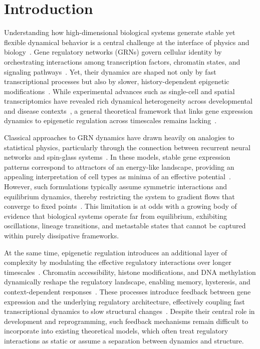 \documentclass[reprint,amsmath,amssymb,aps]{revtex4-2}
\begin{document}
\section{Introduction}
\label{intro}
Understanding how high-dimensional biological systems generate stable yet flexible dynamical behavior is a central challenge at the interface of physics and biology~\cite{Waddington,tripathi2023minimal,Raju1,Raju3}. Gene regulatory networks (GRNs) govern cellular identity by orchestrating interactions among transcription factors, chromatin states, and signaling pathways~\cite{slack1991,Waddington,kaneko2007evolution,KanekoScience2012}. Yet, their dynamics are shaped not only by fast transcriptional processes but also by slower, history-dependent epigenetic modifications~\cite{kaneko2007evolution,KanekoPRR2020}. While experimental advances such as single-cell and spatial transcriptomics have revealed rich dynamical heterogeneity across developmental and disease contexts~\cite{Klein1,garg2023single,Mohit,Mohit2,wang2024transiently,Briscoe1,Briscoe2}, a general theoretical framework that links gene expression dynamics to epigenetic regulation across timescales remains lacking~\cite{KanekoPRR2020,matsushita2022dynamical}.

Classical approaches to GRN dynamics have drawn heavily on analogies to statistical physics, particularly through the connection between recurrent neural networks and spin-glass systems~\cite{raza2016recurrent,tripathi2023minimal,wang2024transiently}. In these models, stable gene expression patterns correspond to attractors of an energy-like landscape, providing an appealing interpretation of cell types as minima of an effective potential~\cite{Waddington,wang2024transiently}. However, such formulations typically assume symmetric interactions and equilibrium dynamics, thereby restricting the system to gradient flows that  converge to fixed points~\cite{Raju1,Raju2,Raju3}. This limitation is at odds with a growing body of evidence that biological systems operate far from equilibrium, exhibiting oscillations, lineage transitions, and metastable states that cannot be captured within purely dissipative frameworks\cite{slack1991,garg2023single,MuTrans,matsushita2022dynamical,Klein1,Briscoe1,Briscoe2}.

At the same time, epigenetic regulation introduces an additional layer of complexity by modulating the effective regulatory interactions over longer timescales~\cite{KanekoScience2012,kaneko2007evolution,KanekoPRR2020}. Chromatin accessibility, histone modifications, and DNA methylation dynamically reshape the regulatory landscape, enabling memory, hysteresis, and context-dependent responses~\cite{kaneko2007evolution,KanekoPRR2020,matsushita2022dynamical,matsushita2023generic}. These processes introduce feedback between gene expression and the underlying regulatory architecture, effectively coupling fast transcriptional dynamics to slow structural changes~\cite{kaneko2007evolution,miyamoto2015pluripotency,KanekoPRR2020,matsushita2022dynamical}. Despite their central role in development and reprogramming, such feedback mechanisms remain difficult to incorporate into existing theoretical models, which often treat regulatory interactions as static or assume a separation between dynamics and structure.
\end{document}

